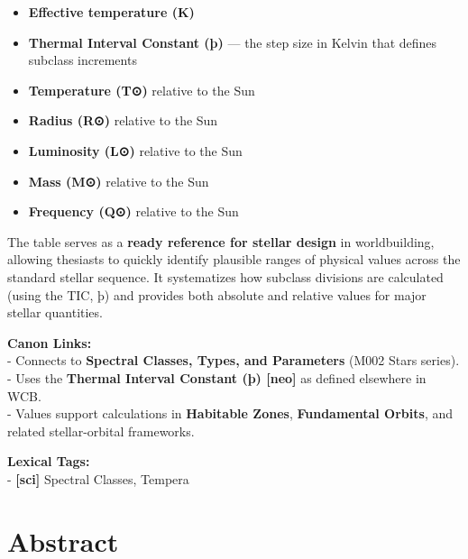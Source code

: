 \documentclass[
  letterpaper,
]{book}
\providecommand{\tightlist}{%
  \setlength{\itemsep}{0pt}\setlength{\parskip}{0pt}}
\begin{document}
\begin{itemize}
\tightlist
\item
  \textbf{Effective temperature (K)}\\
\item
  \textbf{Thermal Interval Constant (þ)} --- the step size in Kelvin
  that defines subclass increments\\
\item
  \textbf{Temperature (T⊙)} relative to the Sun\\
\item
  \textbf{Radius (R⊙)} relative to the Sun\\
\item
  \textbf{Luminosity (L⊙)} relative to the Sun\\
\item
  \textbf{Mass (M⊙)} relative to the Sun\\
\item
  \textbf{Frequency (Q⊙)} relative to the Sun
\end{itemize}

The table serves as a \textbf{ready reference for stellar design} in
worldbuilding, allowing thesiasts to quickly identify plausible ranges
of physical values across the standard stellar sequence. It systematizes
how subclass divisions are calculated (using the TIC, þ) and provides
both absolute and relative values for major stellar quantities.

\textbf{Canon Links:}\\
- Connects to \textbf{Spectral Classes, Types, and Parameters} (M002
Stars series).\\
- Uses the \textbf{Thermal Interval Constant (þ) {[}neo{]}} as defined
elsewhere in WCB.\\
- Values support calculations in \textbf{Habitable Zones},
\textbf{Fundamental Orbits}, and related stellar-orbital frameworks.

\textbf{Lexical Tags:}\\
- \textbf{{[}sci{]}} Spectral Classes, Tempera

\chapter{Abstract}\label{abstract-16}
\end{document}
